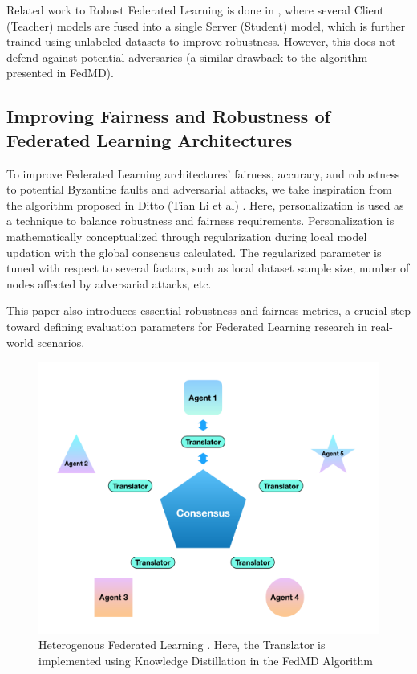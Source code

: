 \documentclass[conference]{IEEEtran}
\begin{document}
Related work to Robust Federated Learning is done in \cite{b5}, where several Client (Teacher) models are fused into a single Server (Student) model, which is further trained using unlabeled datasets to improve robustness. However, this does not defend against potential adversaries (a similar drawback to the algorithm presented in FedMD).

\subsection{Improving Fairness and Robustness of Federated Learning Architectures}
To improve Federated Learning architectures' fairness, accuracy, and robustness to potential Byzantine faults and adversarial attacks, we take inspiration from the algorithm proposed in Ditto (Tian Li et al) \cite{b6}. Here, personalization is used as a technique to balance robustness and fairness requirements. Personalization is mathematically conceptualized through regularization during local model updation with the global consensus calculated. The regularized parameter is tuned with respect to several factors, such as local dataset sample size, number of nodes affected by adversarial attacks, etc.

This paper also introduces essential robustness and fairness metrics, a crucial step toward defining evaluation parameters for Federated Learning research in real-world scenarios.

\begin{figure}[htbp]
\centering
\includegraphics[scale=0.75]{Federated_Learning.png}
\caption{Heterogenous Federated Learning \cite{b4}. Here, the Translator is implemented using Knowledge Distillation in the FedMD Algorithm}
\label{fig}
\end{figure}
\end{document}
